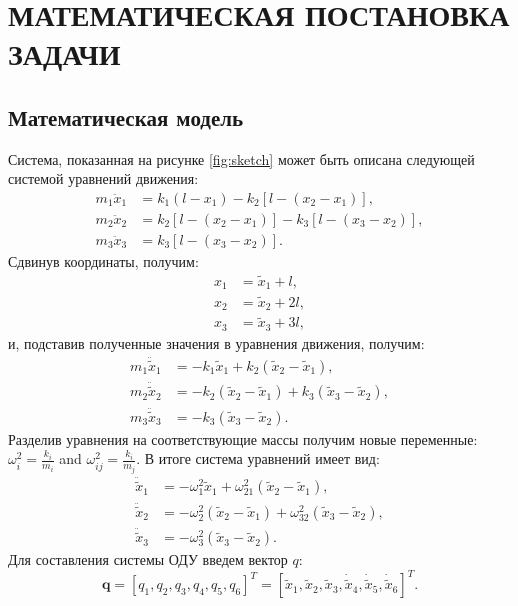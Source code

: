 
\chapter{МАТЕМАТИЧЕСКАЯ ПОСТАНОВКА ЗАДАЧИ}
\section{Математическая модель}

Система, показанная на рисунке \ref{fig:sketch} может быть описана следующей системой уравнений движения:
\begin{align}
	m_1 \ddot{x}_1 &= k_1 (l - x_1) - k_2 \left[ l - (x_2 - x_1) \right], \\
	m_2 \ddot{x}_2 &= k_2 \left[ l - (x_2 - x_1) \right] - k_3 \left[ l - (x_3 - x_2) \right], \\
	m_3 \ddot{x}_3 &= k_3 \left[ l - (x_3 - x_2) \right].
\end{align}
Сдвинув координаты, получим:
\begin{align}
	x_1 &= \tilde{x}_1 + l, \\
	x_2 &= \tilde{x}_2 + 2l, \\
	x_3 &= \tilde{x}_3 + 3l,
\end{align}
и, подставив полученные значения в уравнения движения, получим:
\begin{align}
	m_1 \ddot{\tilde{x}}_1 &= -k_1 \tilde{x}_1 + k_2 (\tilde{x}_2 - \tilde{x}_1), \\
	m_2 \ddot{\tilde{x}}_2 &= -k_2 (\tilde{x}_2 - \tilde{x}_1) + k_3 (\tilde{x}_3 - \tilde{x}_2), \\
	m_3 \ddot{\tilde{x}}_3 &= -k_3 (\tilde{x}_3 - \tilde{x}_2).
\end{align}
Разделив уравнения на соответствующие массы получим новые переменные: $\omega_i^2 = \frac{k_i}{m_i}$ and $\omega_{ij}^2 = \frac{k_i}{m_j}$. В итоге система уравнений имеет вид:
\begin{align}
	\ddot{\tilde{x}}_1 &= -\omega_1^2 \tilde{x}_1 + \omega_{21}^2 (\tilde{x}_2 - \tilde{x}_1), \\
	\ddot{\tilde{x}}_2 &= -\omega_2^2 (\tilde{x}_2 - \tilde{x}_1) + \omega_{32}^2 (\tilde{x}_3 - \tilde{x}_2), \\
	\ddot{\tilde{x}}_3 &= -\omega_3^2 (\tilde{x}_3 - \tilde{x}_2).
\end{align}
Для составления системы ОДУ введем вектор $q$:
\begin{equation}\label{eq:vector}
	\bm{q} = [q_1, q_2, q_3, q_4, q_5, q_6]^T = [\tilde{x}_1, \tilde{x}_2, \tilde{x}_3, \dot{\tilde{x}}_4, \dot{\tilde{x}}_5, \dot{\tilde{x}}_6]^T.
\end{equation}
